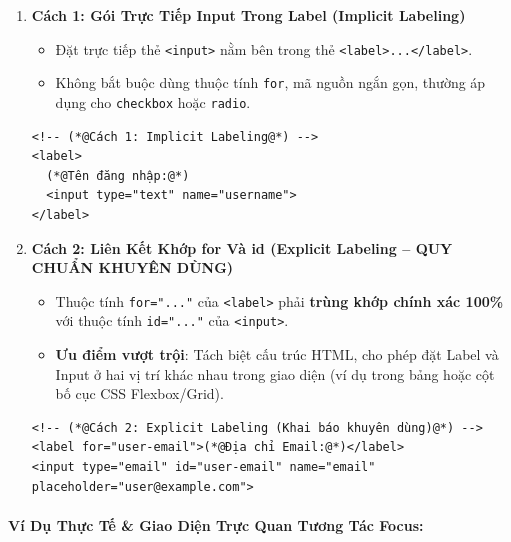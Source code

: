 \documentclass[11pt,oneside]{book}
\newcommand{\codeinline}[1]{\textcolor{accentOrange}{\texttt{#1}}}
\newcommand{\term}[1]{\textbf{\textcolor{primaryBlue}{#1}}}
\begin{document}
\begin{enumerate}[leftmargin=1.5em, itemsep=8pt, parsep=0pt]
    \item \textbf{Cách 1: Gói Trực Tiếp Input Trong Label (\term{Implicit Labeling})}
    \begin{itemize}[leftmargin=1.2em, itemsep=3pt]
        \item Đặt trực tiếp thẻ \codeinline{<input>} nằm bên trong thẻ \codeinline{<label>...</label>}.
        \item Không bắt buộc dùng thuộc tính \codeinline{for}, mã nguồn ngắn gọn, thường áp dụng cho \codeinline{checkbox} hoặc \codeinline{radio}.
    \end{itemize}
    \begin{codeWindow}
\begin{lstlisting}[language=HTML5]
<!-- (*@Cách 1: Implicit Labeling@*) -->
<label>
  (*@Tên đăng nhập:@*)
  <input type="text" name="username">
</label>
\end{lstlisting}
    \end{codeWindow}

    \item \textbf{Cách 2: Liên Kết Khớp for Và id (\term{Explicit Labeling} -- \textcolor{accentOrange}{\textbf{QUY CHUẨN KHUYÊN DÙNG}})}
    \begin{itemize}[leftmargin=1.2em, itemsep=3pt]
        \item Thuộc tính \codeinline{for="..."} của \codeinline{<label>} phải \textbf{trùng khớp chính xác 100\%} với thuộc tính \codeinline{id="..."} của \codeinline{<input>}.
        \item \textbf{Ưu điểm vượt trội}: Tách biệt cấu trúc HTML, cho phép đặt Label và Input ở hai vị trí khác nhau trong giao diện (ví dụ trong bảng hoặc cột bố cục CSS Flexbox/Grid).
    \end{itemize}
    \begin{codeWindow}
\begin{lstlisting}[language=HTML5]
<!-- (*@Cách 2: Explicit Labeling (Khai báo khuyên dùng)@*) -->
<label for="user-email">(*@Địa chỉ Email:@*)</label>
<input type="email" id="user-email" name="email" placeholder="user@example.com">
\end{lstlisting}
    \end{codeWindow}
\end{enumerate}

\paragraph{Ví Dụ Thực Tế \& Giao Diện Trực Quan Tương Tác Focus:}
\end{document}
